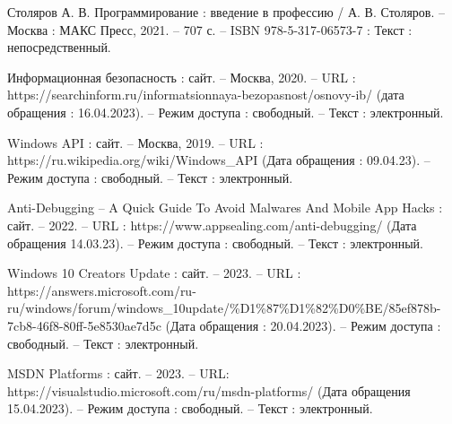 

\begin{thebibliography}{0}
   Столяров А. В. Программирование : введение в
  профессию / А. В. Столяров. -- Москва : МАКС Пресс, 2021. -- 707 с. -- ISBN
  978-5-317-06573-7 : Текст : непосредственный. 

   Информационная безопасность : сайт. -- Москва, 2020. -- URL :
  https://searchinform.ru/informatsionnaya-bezopasnost/osnovy-ib/ (дата
  обращения : 16.04.2023). -- Режим доступа : свободный. -- Текст : электронный.

   Windows API : сайт. -- Москва, 2019. --  URL :
  https://ru.wikipedia.org/wiki/Windows\_API (Дата обращения : 09.04.23). --
  Режим доступа : свободный. -- Текст : электронный.

   Anti-Debugging – A Quick Guide To Avoid Malwares And
  Mobile App Hacks : сайт. -- 2022. -- URL :
  https://www.appsealing.com/anti-debugging/ (Дата обращения 14.03.23). -- Режим
  доступа : свободный. -- Текст : электронный.

   Windows 10 Creators Update : сайт. -- 2023. -- URL :
  https://answers.microsoft.com/ru-ru/windows/forum/windows\_10update/\%D1\%87\%D1\%82\%D0\%BE/85ef878b-7cb8-46f8-80ff-5e8530ae7d5c
  (Дата обращения : 20.04.2023). -- Режим доступа : свободный. -- Текст : электронный.

   MSDN Platforms : сайт. -- 2023. --  URL:
  https://visualstudio.microsoft.com/ru/msdn-platforms/ (Дата обращения
  15.04.2023). -- Режим доступа : свободный. -- Текст : электронный.


\end{thebibliography}
